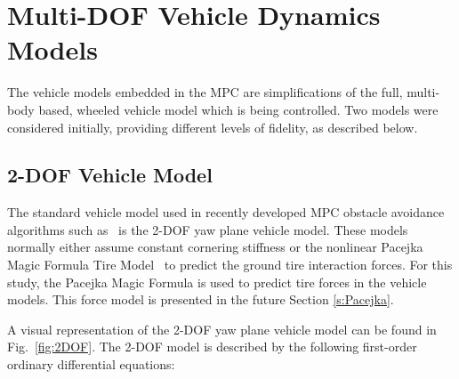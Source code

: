\documentclass[12pt,onecolumn]{report}
\newcommand{\CHRONO}{{\sffamily{{Chrono}}}}
\begin{document}

\section{Multi-DOF Vehicle Dynamics Models}\label{s:IntModel}

The vehicle models embedded in the MPC are simplifications of the full, multi-body based, {\CHRONO} wheeled vehicle model which is being controlled.  Two models were considered initially, providing different levels of fidelity, as described below.


\subsection{2-DOF Vehicle Model}\label{ss:2DOFModel}
The standard vehicle model used in recently developed MPC obstacle avoidance algorithms such as~\cite{ModelFidelity2016} is the 2-DOF yaw plane vehicle model. These models normally either assume constant cornering stiffness or the nonlinear Pacejka Magic Formula Tire Model~\cite{Pacejka1997} to predict the ground tire interaction forces. For this study, the Pacejka Magic Formula is used to predict tire forces in the vehicle models. This force model is presented in the future Section \ref{s:Pacejka}.   

A visual representation of the 2-DOF yaw plane vehicle model can be found in Fig.~\ref{fig:2DOF}. The 2-DOF model is described by the following first-order ordinary differential equations:
\end{document}
